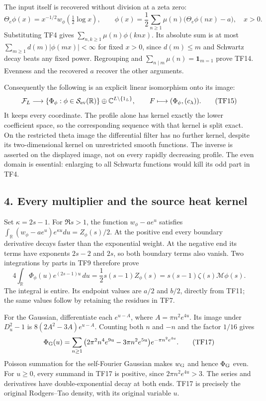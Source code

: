 \documentclass[
  10pt,
  a4paper,
]{article}
\begin{document}
The input itself is recovered without division at a zeta zero: \[
\Theta_e\phi(x)=x^{-1/2}w_\phi(\tfrac12\log x),\qquad
\phi(x)=\frac12\sum_{n\ge1}\mu(n)
\big(\Theta_e\phi(nx)-a\big),\quad x>0.
\tag{TF14}
\] Substituting TF4 gives \(\sum_{n,k\ge1}\mu(n)\phi(knx)\). Its
absolute sum is at most \(\sum_{m\ge1}d(m)|\phi(mx)|<\infty\) for fixed
\(x>0\), since \(d(m)\le m\) and Schwartz decay beats any fixed power.
Regrouping and \(\sum_{n\mid m}\mu(n)=\mathbf1_{m=1}\) prove TF14.
Evenness and the recovered \(a\) recover the other arguments.

Consequently the following is an explicit linear isomorphism onto its
image: \[
\mathcal F_L\longrightarrow
\{\Phi_\phi:\phi\in\mathcal S_{\rm ev}(\mathbb R)\}
\oplus\mathbb C^{L\setminus\{1_L\}},
\qquad F\longmapsto(\Phi_\phi,(c_\lambda)).
\tag{TF15}
\] It keeps every coordinate. The profile alone has kernel exactly the
lower coefficient space, so the corresponding sequence with that kernel
is split exact. On the restricted theta image the differential filter
has no further kernel, despite its two-dimensional kernel on
unrestricted smooth functions. The inverse is asserted on the displayed
image, not on every rapidly decreasing profile. The even domain is
essential: enlarging to all Schwartz functions would kill its odd part
in TF4.

\subsection{4. Every multiplier and the source heat
kernel}\label{every-multiplier-and-the-source-heat-kernel}

Set \(\kappa=2s-1\). For \(\Re s>1\), the function \(w_\phi-ae^u\)
satisfies \(\int_{\mathbb R}(w_\phi-ae^u)e^{\kappa u}du=Z_\phi(s)/2\).
At the positive end every boundary derivative decays faster than the
exponential weight. At the negative end its terms have exponents
\(2s-2\) and \(2s\), so both boundary terms also vanish. Two
integrations by parts in TF9 therefore prove \[
4\int_{\mathbb R}\Phi_\phi(u)e^{(2s-1)u}\,du
=\frac12s(s-1)Z_\phi(s)
=s(s-1)\zeta(s)\mathcal M\phi(s).
\tag{TF16}
\] The integral is entire. Its endpoint values are \(a/2\) and \(b/2\),
directly from TF11; the same values follow by retaining the residues in
TF7.

For the Gaussian, differentiate each \(e^{u-A}\), where
\(A=\pi n^2e^{4u}\). Its image under \(D_u^2-1\) is
\(8(2A^2-3A)e^{u-A}\). Counting both \(n\) and \(-n\) and the factor
\(1/16\) gives \[
\Phi_{\rm G}(u)=\sum_{n\ge1}
\big(2\pi^2n^4e^{9u}-3\pi n^2e^{5u}\big)e^{-\pi n^2e^{4u}}.
\tag{TF17}
\] Poisson summation for the self-Fourier Gaussian makes \(w_{\rm G}\)
and hence \(\Phi_{\rm G}\) even. For \(u\ge0\), every summand in TF17 is
positive, since \(2\pi n^2e^{4u}>3\). The series and derivatives have
double-exponential decay at both ends. TF17 is precisely the original
Rodgers--Tao density, with its original variable \(u\).
\end{document}
